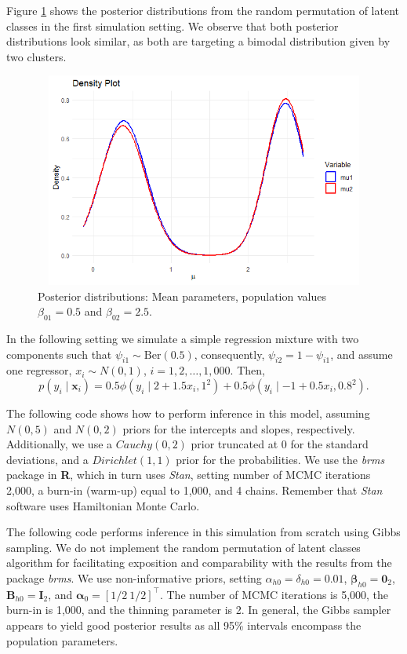 Figure \ref{figMeanPerm} shows the posterior distributions from the random permutation of latent classes in the first simulation setting. We observe that both posterior distributions look similar, as both are targeting a bimodal distribution given by two clusters.

\begin{figure}[!h]
	\includegraphics[width=340pt, height=200pt]{Chapters/chapter11/figures/Permutation.png}
	\caption[List of figure caption goes here]{Posterior distributions: Mean parameters, population values $\beta_{01}=0.5$ and $\beta_{02}=2.5$.}\label{figMeanPerm}
\end{figure}
 
In the following setting we simulate a simple regression mixture with two components such that $\psi_{i1}\sim \text{Ber}(0.5)$, consequently, $\psi_{i2}=1-\psi_{i1}$, and assume one regressor, $x_i\sim N(0,1)$, $i=1,2,\dots,1,000$. Then, 
$$p(y_i \mid \boldsymbol{x}_i) = 
0.5 \phi(y_i \mid 2+1.5x_i,1^2)+0.5 \phi(y_i \mid -1+0.5x_i,0.8^2).$$

The following code shows how to perform inference in this model, assuming $N(0,5)$ and $N(0,2)$ priors for the intercepts and slopes, respectively. Additionally, we use a $Cauchy(0,2)$ prior truncated at 0 for the standard deviations, and a $Dirichlet(1,1)$ prior for the probabilities. We use the \textit{brms} package in \textbf{R}, which in turn uses \textit{Stan}, setting number of MCMC iterations 2,000, a burn-in (warm-up) equal to 1,000, and 4 chains. Remember that \textit{Stan} software uses Hamiltonian Monte Carlo.

The following code performs inference in this simulation from scratch using Gibbs sampling. We do not implement the random permutation of latent classes algorithm for facilitating exposition and comparability with the results from the package \textit{brms}. We use non-informative priors, setting $\alpha_{h0}=\delta_{h0}=0.01$, $\boldsymbol{\beta}_{h0}=\boldsymbol{0}_2$, $\boldsymbol{B}_{h0}=\boldsymbol{I}_2$, and $\boldsymbol{\alpha}_0=[1/2 \ 1/2]^{\top}$. The number of MCMC iterations is 5,000, the burn-in is 1,000, and the thinning parameter is 2. In general, the Gibbs sampler appears to yield good posterior results as all 95\% intervals encompass the population parameters. 

